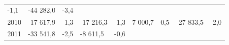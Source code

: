 \begin{longtable}[]{@{}lllllllll@{}}
\begin{minipage}[t]{0.06\columnwidth}
-1,1\strut
\end{minipage} & \begin{minipage}[t]{0.09\columnwidth}\raggedright
-44 282,0\strut
\end{minipage} & \begin{minipage}[t]{0.06\columnwidth}\raggedright
-3,4\strut
\end{minipage}\tabularnewline
\begin{minipage}[t]{0.05\columnwidth}\raggedright
2010\strut
\end{minipage} & \begin{minipage}[t]{0.10\columnwidth}\raggedright
-17 617,9\strut
\end{minipage} & \begin{minipage}[t]{0.06\columnwidth}\raggedright
-1,3\strut
\end{minipage} & \begin{minipage}[t]{0.16\columnwidth}\raggedright
-17 216,3\strut
\end{minipage} & \begin{minipage}[t]{0.06\columnwidth}\raggedright
-1,3\strut
\end{minipage} & \begin{minipage}[t]{0.12\columnwidth}\raggedright
7 000,7\strut
\end{minipage} & \begin{minipage}[t]{0.06\columnwidth}\raggedright
0,5\strut
\end{minipage} & \begin{minipage}[t]{0.09\columnwidth}\raggedright
-27 833,5\strut
\end{minipage} & \begin{minipage}[t]{0.06\columnwidth}\raggedright
-2,0\strut
\end{minipage}\tabularnewline
\begin{minipage}[t]{0.05\columnwidth}\raggedright
2011\strut
\end{minipage} & \begin{minipage}[t]{0.10\columnwidth}\raggedright
-33 541,8\strut
\end{minipage} & \begin{minipage}[t]{0.06\columnwidth}\raggedright
-2,5\strut
\end{minipage} & \begin{minipage}[t]{0.16\columnwidth}\raggedright
-8 611,5\strut
\end{minipage} & \begin{minipage}[t]{0.06\columnwidth}\raggedright
-0,6\strut
\end{minipage} & \begin{minipage}[t]{0.12\columnwidth}\raggedright

\end{minipage}
\end{longtable}
